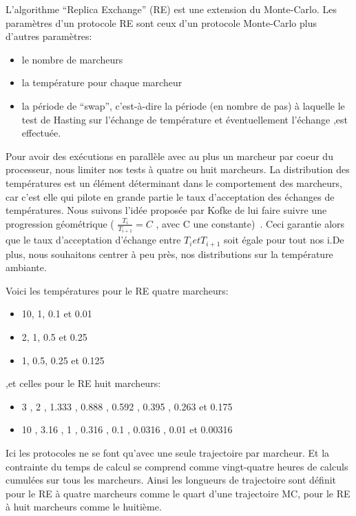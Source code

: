 L'algorithme ``Replica Exchange'' (RE) est une extension du Monte-Carlo. Les paramètres d'un protocole RE sont ceux d'un protocole Monte-Carlo plus d'autres paramètres:

\begin{itemize}
\item le nombre de marcheurs
\item la température pour chaque marcheur
\item la période de ``swap'', c'est-à-dire la période  (en nombre de pas) à  laquelle le test de Hasting sur l'échange de température et éventuellement l'échange ,est effectuée.
\end{itemize}
Pour avoir des exécutions en parallèle avec au plus un marcheur par coeur du processeur, nous limiter nos tests à quatre ou huit marcheurs.
La distribution des températures est un élément déterminant dans le comportement des marcheurs, car c'est elle qui pilote en grande partie le taux d'acceptation des échanges de températures. Nous suivons l'idée proposée par Kofke de lui faire suivre une progression géométrique ( $ \frac{T_i}{T_{i+1}}=C $ , avec C une constante)~\citep{refRE1,refRE2,refRE3}. Ceci garantie alors que le taux d'acceptation d'échange entre $T_i et T_{i+1}$ soit égale pour tout nos i.De plus, nous souhaitons centrer à peu près, nos distributions sur la température ambiante.

Voici les températures pour le RE quatre marcheurs:

\begin{itemize} 
\item 10, 1, 0.1 et 0.01
\item 2, 1, 0.5 et 0.25 
\item 1, 0.5, 0.25 et 0.125
\end{itemize} 

,et celles pour le RE huit marcheurs:

\begin{itemize} 
\item 3 , 2 , 1.333 , 0.888 , 0.592 , 0.395 , 0.263 et 0.175 
\item 10 , 3.16 , 1 , 0.316 , 0.1 , 0.0316 , 0.01 et 0.00316
\end{itemize} 

Ici les protocoles ne se font qu'avec une seule trajectoire par marcheur. Et la contrainte du temps de calcul se comprend comme vingt-quatre heures de calculs cumulées sur tous les marcheurs.
Ainsi les longueurs de trajectoire sont définit pour le RE à quatre marcheurs comme le quart d'une trajectoire MC, pour le RE à huit marcheurs comme le huitième.

